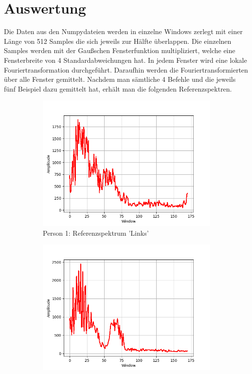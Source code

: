 \documentclass[12pt, oneside, a4paper, \docLanguage]{report}
\begin{document}
\section{Auswertung}
\label{chap:VERSUCH_2_AUSWERTUNG}
Die Daten aus den Numpydateien werden in einzelne Windows zerlegt mit einer Länge von 512 Samples die sich jeweils zur Hälfte überlappen.
\newline
Die einzelnen Samples werden mit der Gaußschen Fensterfunktion multipliziert, welche eine Fensterbreite von 4 Standardabweichungen hat.
In jedem Fenster wird eine lokale Fouriertransformation durchgeführt.
Daraufhin werden die Fouriertransformierten über alle Fenster gemittelt.
\newline
Nachdem man sämtliche 4 Befehle und die jeweils fünf Beispiel dazu gemittelt hat, erhält man die folgenden Referenzspektren.
\begin{figure}[H]
\centering
	\begin{subfigure}{.5\textwidth}
  		\centering
 		 \includegraphics[width=.95\linewidth]{../data/img/Versuch2/2Averagelinks.png}
  		\caption{Person 1: Referenzspektrum 'Links'}
 		 \label{fig:sub1}
	\end{subfigure}%
	\begin{subfigure}{.5\textwidth}
  		\centering
 		 \includegraphics[width=.95\linewidth]{../data/img/Versuch2/2Averagerechts.png}

\end{subfigure}
\end{figure}
\end{document}
